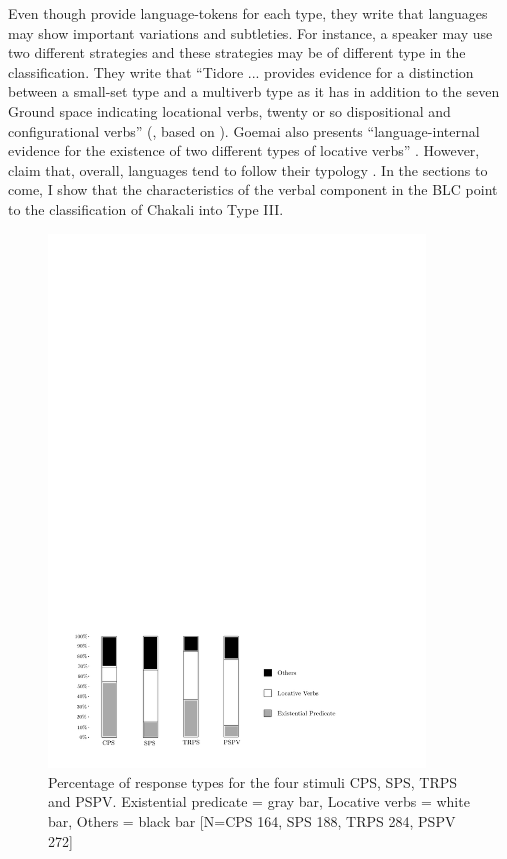 Even though \citeauthor{Amek07b}  provide language-tokens  for each type, they
write that languages may show  important variations and subtleties. For
instance, a speaker may use two different strategies and  these strategies may
be  of different type in the classification. They write that ``Tidore  ...
provides evidence for a distinction between a small-set type and a multiverb
type as it has in addition to the seven Ground space indicating locational
verbs, twenty or so dispositional and configurational verbs''
(\citet[863]{Amek07b}, based on \cite{vanS07}).  Goemai also presents
``language-internal evidence for the existence of two different types of
locative verbs''  \citep[893]{Hell07}.  However, \citeauthor{Amek07b}  claim
that, overall, languages tend to follow their typology \citep[867]{Amek07b}.  In
the  sections to come, I  show that the characteristics of the verbal component
in the BLC  point to the classification of Chakali into Type III. 




\begin{figure}[h]
\centering

 \includegraphics[width=10cm]{Graphic/Pictures/figure-verb-space.pdf}

\caption[Percentage of response types for the  four stimuli CPS, SPS, TRPS and
PSPV]{Percentage of response types for the  four stimuli CPS, SPS, TRPS and
PSPV. Existential predicate = gray bar, Locative verbs = white bar, Others =
black bar [N=CPS 164, SPS 188, TRPS 284, PSPV 272]\label{fig:exist-loc-other}}
\end{figure} 

